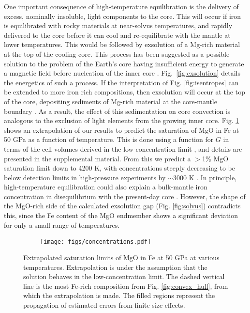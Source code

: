 One important consequence of high-temperature equilibration is the delivery of excess,
nominally insoluble, light components to the core. This will occur if iron is
equilibrated with rocky materials at near-solvus temperatures, and rapidly delivered to
the core before it can cool and re-equilibrate with the mantle at lower temperatures.
This would be followed by exsolution of a Mg-rich material at the top of the cooling
core. This process has been suggested as a possible solution to the problem of the
Earth's core having  insufficient energy to generate a magnetic field before nucleation
of the inner core \citep{Stevenson2012}. Fig.~\ref{fig:exsolution} details the
energetics of such a process. If the interpretation of Fig.
\ref{fig:isentropes} can be extended to more iron rich compositions, then exsolution will
occur at the top of the core, depositing sediments of Mg-rich material at the core-mantle
boundary \citep{buffett2000}. As a result, the effect of this sedimentation on core
convection is analogous to the exclusion of light elements from the growing inner core.
Fig. \ref{fig:concentrations} shows an extrapolation of our results to predict the
saturation of MgO in Fe at 50 GPa as a function of temperature.  This is done using a
function for $G$ in terms of the cell volumes derived in the low-concentration limit
\citep{Wilson2012a,Wahl2013}, and details are presented in the supplemental material. From
this we predict a $>$1\% MgO saturation limit down to 4200 K, with concentrations steeply
decreasing to be below detection limits in high-pressure experiments by $\sim$3000 K
\citep{Knittle1991,Ozawa2008a}. In principle, high-temperature equilibration could also
explain a bulk-mantle iron concentration in disequilibrium with the present-day core
\citep{Ozawa2008a,Tsuno2013}. However, the shape of the MgO-rich side of the calculated
exsolution gap (Fig. \ref{fig:solvus}) contradicts this, since the Fe content of the MgO
endmember shows a significant deviation for only a small range of temperatures.

\begin{figure}[h!]  
  \centering
    \texttt{[image: figs/concentrations.pdf]}  
\caption{Extrapolated saturation limits of MgO in Fe at 50 GPa at various temperatures.
  Extrapolation is under the assumption that the solution behaves in the
  low-concentration limit. The dashed vertical line is the most Fe-rich composition from
  Fig. \ref{fig:convex_hull}, from which the extrapolation is made. The filled regions
  represent the propagation of estimated errors from finite size effects.}
\label{fig:concentrations}
\end{figure}

